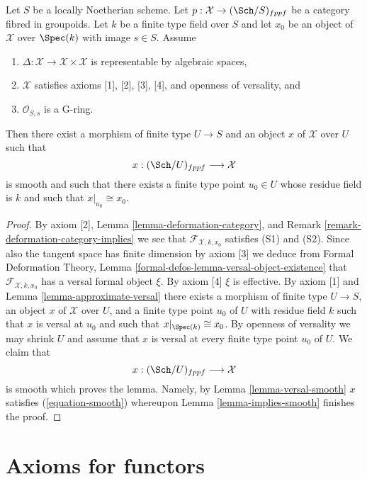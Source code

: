 \begin{lemma}
\label{lemma-get-smooth}
Let $S$ be a locally Noetherian scheme. Let
$p : \mathcal{X} \to (\Sch/S)_{fppf}$ be a category fibred in groupoids.
Let $k$ be a finite type field over $S$ and let $x_0$ be an object of
$\mathcal{X}$ over $\Spec(k)$ with image $s \in S$. Assume
\begin{enumerate}
\item $\Delta : \mathcal{X} \to \mathcal{X} \times \mathcal{X}$ is
representable by algebraic spaces,
\item $\mathcal{X}$ satisfies axioms [1], [2], [3], [4], and
openness of versality, and
\item $\mathcal{O}_{S, s}$ is a G-ring.
\end{enumerate}
Then there exist a morphism of finite type $U \to S$ and an object
$x$ of $\mathcal{X}$ over $U$ such that
$$
x : (\Sch/U)_{fppf} \longrightarrow \mathcal{X}
$$
is smooth and such that there exists a finite type point $u_0 \in U$
whose residue field is $k$ and such that $x|_{u_0} \cong x_0$.
\end{lemma}

\begin{proof}
By axiom [2], Lemma \ref{lemma-deformation-category}, and
Remark \ref{remark-deformation-category-implies}
we see that $\mathcal{F}_{\mathcal{X}, k, x_0}$ satisfies (S1) and (S2).
Since also the tangent space has finite dimension by axiom [3]
we deduce from Formal Deformation Theory, Lemma
\ref{formal-defos-lemma-versal-object-existence}
that $\mathcal{F}_{\mathcal{X}, k, x_0}$ has a versal formal object $\xi$.
By axiom [4] $\xi$ is effective. By axiom [1] and
Lemma \ref{lemma-approximate-versal}
there exists a morphism of finite type $U \to S$, an object $x$ of
$\mathcal{X}$ over $U$, and a finite type point $u_0$ of $U$ with residue
field $k$ such that $x$ is versal at $u_0$ and such that
$x|_{\Spec(k)} \cong x_0$. By openness of versality we may shrink
$U$ and assume that $x$ is versal at every finite type point $u_0$ of $U$.
We claim that
$$
x : (\Sch/U)_{fppf} \longrightarrow \mathcal{X}
$$
is smooth which proves the lemma. Namely, by Lemma \ref{lemma-versal-smooth}
$x$ satisfies (\ref{equation-smooth})
whereupon Lemma \ref{lemma-implies-smooth}
finishes the proof.
\end{proof}










\section{Axioms for functors}
\label{section-axioms-functors}

